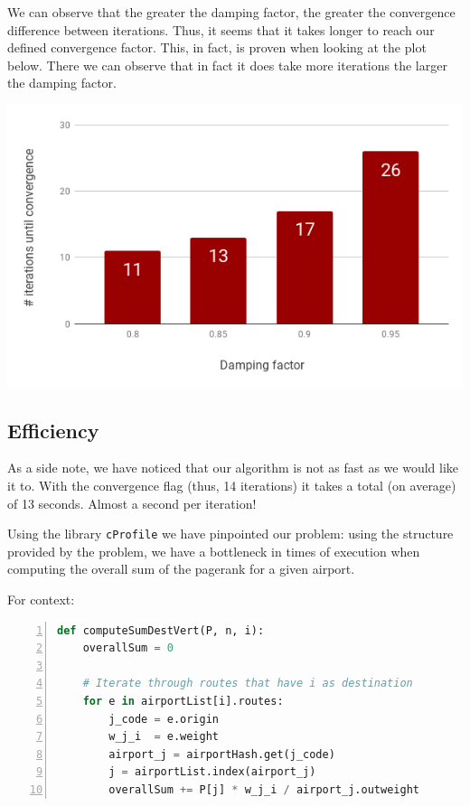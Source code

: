 \documentclass[10pt, a4paper]{article}
\begin{document}
We can observe that the greater the damping factor, the greater the convergence difference between iterations. Thus, it seems that it takes longer to reach our defined convergence factor. This, in fact, is proven when looking at the plot below. There we can observe that in fact it does take more iterations the larger the damping factor.


\begin{center}
    \includegraphics[width=0.7\linewidth]{damp_it.png}
\end{center}


\subsection{Efficiency}
As a side note, we have noticed that our algorithm is not as fast as we would like it to. With the convergence flag (thus, 14 iterations) it takes a total (on average) of 13 seconds. Almost a second per iteration!

Using the library \texttt{cProfile} we have pinpointed our problem: using the structure provided by the problem, 
we have a bottleneck in times of execution when computing the overall sum of the pagerank for a given airport. 

For context:

\begin{lstlisting}[language=Python,  breaklines=true, numbers=left,   frame=single]
def computeSumDestVert(P, n, i):
    overallSum = 0

    # Iterate through routes that have i as destination
    for e in airportList[i].routes:
        j_code = e.origin
        w_j_i  = e.weight
        airport_j = airportHash.get(j_code)
        j = airportList.index(airport_j)
        overallSum += P[j] * w_j_i / airport_j.outweight
\end{lstlisting}
\end{document}
